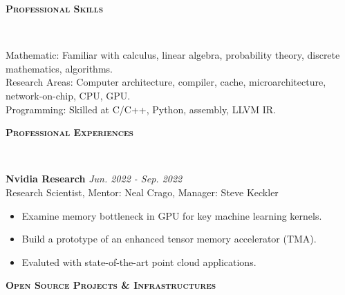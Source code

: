 \documentclass[a4paper]{article}
\newenvironment{changemargin}[2]{%
  \begin{list}{}{%
    \setlength{\topsep}{0pt}%
    \setlength{\leftmargin}{#1}%
    \setlength{\rightmargin}{#2}%
    \setlength{\listparindent}{\parindent}%
    \setlength{\itemindent}{\parindent}%
    \setlength{\parsep}{\parskip}%
  }%
  \item[]}{\end{list}
}
\newcommand{\lineover}{
	\begin{changemargin}{-0.05in}{-0.05in}
		\vspace*{-8pt}
		\hrulefill \\
		\vspace*{-2pt}
	\end{changemargin}
}
\newcommand{\header}[1]{
	\begin{changemargin}{-0.5in}{-0.5in}
		\scshape{\large \textbf{#1}}\\
  	\lineover
	\end{changemargin}
}
\newenvironment{body} {
	\vspace*{-16pt}
	\begin{changemargin}{-0.5in}{-0.5in}
  }	
	{\end{changemargin}
}
\begin{document}
\smallskip
\smallskip

\header{Professional Skills}

\begin{body}
	\vspace{14pt}
	Mathematic: Familiar with calculus, linear algebra, probability theory, discrete mathematics, algorithms.\\
	\smallskip
  Research Areas: Computer architecture, compiler, cache, microarchitecture, network-on-chip, CPU, GPU.\\
	\smallskip
	Programming: Skilled at C/C++, Python, assembly, LLVM IR.\\
	\smallskip

\end{body}
\smallskip
\smallskip

\header{Professional Experiences}

\begin{body}
	\vspace{14pt}
	\textbf{Nvidia Research} \hfill \emph{Jun. 2022 - Sep. 2022} \\
	Research Scientist, Mentor: Neal Crago, Manager: Steve Keckler
	\begin{itemize}
	\itemsep 0pt
	\item Examine memory bottleneck in GPU for key machine learning kernels.
	\item Build a prototype of an enhanced tensor memory accelerator (TMA).
	\item Evaluted with state-of-the-art point cloud applications.
	\end{itemize}
	\smallskip

\end{body}
\smallskip
\smallskip

\header{Open Source Projects \& Infrastructures}
\end{document}
